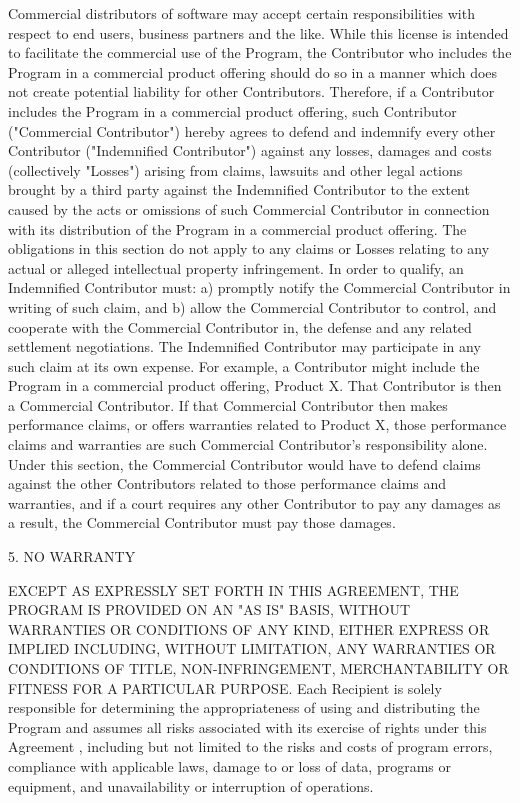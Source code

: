 Commercial distributors of software may accept certain responsibilities
with respect to end users, business partners and the like. While
this license is intended to facilitate the commercial use of
the Program, the Contributor who includes the Program in a commercial
product offering should do so in a manner which does not create
potential liability for other Contributors. Therefore, if a Contributor
includes the Program in a commercial product offering, such Contributor
("Commercial Contributor") hereby agrees to defend and indemnify
every other Contributor ("Indemnified Contributor") against any
losses, damages and costs (collectively "Losses") arising from
claims, lawsuits and other legal actions brought by a third party
against the Indemnified Contributor to the extent caused by the
acts or omissions of such Commercial Contributor in connection
with its distribution of the Program in a commercial product
offering. The obligations in this section do not apply to any
claims or Losses relating to any actual or alleged intellectual
property infringement. In order to qualify, an Indemnified Contributor
must: a) promptly notify the Commercial Contributor in writing
of such claim, and b) allow the Commercial Contributor to control,
and cooperate with the Commercial Contributor in, the defense
and any related settlement negotiations. The Indemnified Contributor
may participate in any such claim at its own expense.
For example, a Contributor might include the Program in a commercial
product offering, Product X. That Contributor is then a Commercial
Contributor. If that Commercial Contributor then makes performance
claims, or offers warranties related to Product X, those performance
claims and warranties are such Commercial Contributor's responsibility
alone. Under this section, the Commercial Contributor would have
to defend claims against the other Contributors related to those
performance claims and warranties, and if a court requires any
other Contributor to pay any damages as a result, the Commercial
Contributor must pay those damages.


5. NO WARRANTY

EXCEPT AS EXPRESSLY SET FORTH IN THIS AGREEMENT, THE PROGRAM
IS PROVIDED ON AN "AS IS" BASIS, WITHOUT WARRANTIES OR CONDITIONS
OF ANY KIND, EITHER EXPRESS OR IMPLIED INCLUDING, WITHOUT LIMITATION,
ANY WARRANTIES OR CONDITIONS OF TITLE, NON-INFRINGEMENT, MERCHANTABILITY
OR FITNESS FOR A PARTICULAR PURPOSE. Each Recipient is solely
responsible for determining the appropriateness of using and
distributing the Program and assumes all risks associated with
its exercise of rights under this Agreement , including but not
limited to the risks and costs of program errors, compliance
with applicable laws, damage to or loss of data, programs or
equipment, and unavailability or interruption of operations.


